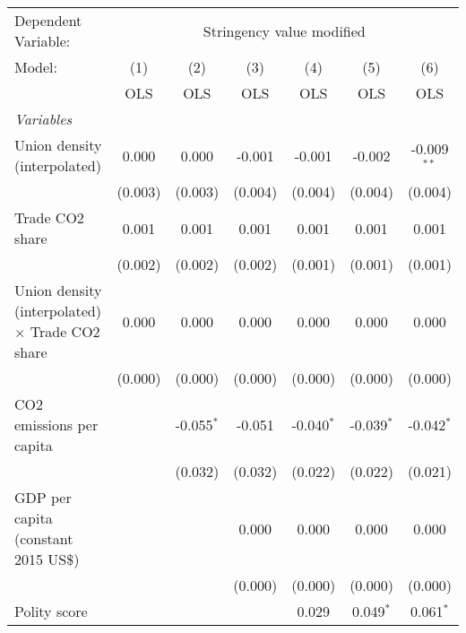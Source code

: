 
\begingroup
\centering
\begin{tabular}{lcccccc}
   \toprule
   Dependent Variable: & \multicolumn{6}{c}{Stringency value modified}\\
   Model:                                                 & (1)     & (2)          & (3)     & (4)          & (5)          & (6)\\  
                                                          &  OLS    & OLS          & OLS     & OLS          & OLS          & OLS\\  
   \midrule
   \emph{Variables}\\
   Union density (interpolated)                           & 0.000   & 0.000        & -0.001  & -0.001       & -0.002       & -0.009$^{**}$\\   
                                                          & (0.003) & (0.003)      & (0.004) & (0.004)      & (0.004)      & (0.004)\\   
   Trade CO2 share                                        & 0.001   & 0.001        & 0.001   & 0.001        & 0.001        & 0.001\\   
                                                          & (0.002) & (0.002)      & (0.002) & (0.001)      & (0.001)      & (0.001)\\   
   Union density (interpolated) $\times$ Trade CO2 share  & 0.000   & 0.000        & 0.000   & 0.000        & 0.000        & 0.000\\   
                                                          & (0.000) & (0.000)      & (0.000) & (0.000)      & (0.000)      & (0.000)\\   
   CO2 emissions per capita                               &         & -0.055$^{*}$ & -0.051  & -0.040$^{*}$ & -0.039$^{*}$ & -0.042$^{*}$\\   
                                                          &         & (0.032)      & (0.032) & (0.022)      & (0.022)      & (0.021)\\   
   GDP per capita (constant 2015 US\$)                    &         &              & 0.000   & 0.000        & 0.000        & 0.000\\   
                                                          &         &              & (0.000) & (0.000)      & (0.000)      & (0.000)\\   
   Polity score                                           &         &              &         & 0.029        & 0.049$^{*}$  & 0.061$^{*}$\\   

\end{tabular}
